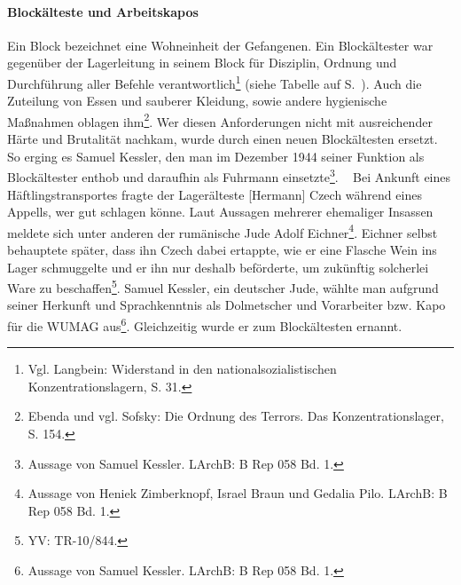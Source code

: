\paragraph{Blockälteste und Arbeitskapos}
Ein Block bezeichnet eine Wohneinheit der Gefangenen. Ein Blockältester war gegenüber der Lagerleitung in seinem Block für Disziplin, Ordnung und Durchführung aller Befehle verantwortlich\footnote{Vgl. Langbein: Widerstand in den nationalsozialistischen Konzentrationslagern, S. 31.} (siehe Tabelle auf S.~\pageref{blockaeltesten}). Auch die Zuteilung von Essen und sauberer Kleidung, sowie andere hygienische Maßnahmen oblagen ihm\footnote{Ebenda und vgl. Sofsky: Die Ordnung des Terrors. Das Konzentrationslager, S. 154.}. Wer diesen Anforderungen nicht mit ausreichender Härte und Brutalität nachkam, wurde durch einen neuen Blockältesten ersetzt. So erging es Samuel Kessler, den man im Dezember 1944 seiner Funktion als Blockältester enthob und daraufhin als Fuhrmann einsetzte\footnote{Aussage von Samuel Kessler. LArchB: B Rep 058 Bd. 1.}.
~\newline
Bei Ankunft eines Häftlingstransportes fragte der Lagerälteste [Hermann] Czech während eines Appells, wer gut schlagen könne. Laut Aussagen mehrerer ehemaliger Insassen meldete sich unter anderen der rumänische Jude Adolf Eichner\footnote{Aussage von Heniek Zimberknopf, Israel Braun und Gedalia Pilo. LArchB: B Rep 058 Bd. 1.}. Eichner selbst behauptete später, dass ihn Czech dabei ertappte, wie er eine Flasche Wein ins Lager schmuggelte und er ihn nur deshalb beförderte, um zukünftig solcherlei Ware zu beschaffen\footnote{YV: TR-10/844.}. Samuel Kessler, ein deutscher Jude, wählte man aufgrund seiner Herkunft und Sprachkenntnis als Dolmetscher und Vorarbeiter bzw. Kapo für die WUMAG aus\footnote{Aussage von Samuel Kessler. LArchB: B Rep 058 Bd. 1.}. Gleichzeitig wurde er zum Blockältesten ernannt.\newline

